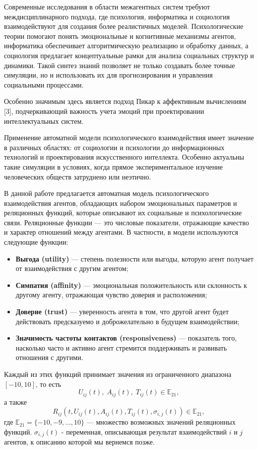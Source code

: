 \documentclass[12pt]{article}
\begin{document}
Современные исследования в области межагентных систем требуют междисциплинарного подхода, где психология, информатика и социология взаимодействуют для создания более реалистичных моделей. Психологические теории помогают понять эмоциональные и когнитивные механизмы агентов, информатика обеспечивает алгоритмическую реализацию и обработку данных, а социология предлагает концептуальные рамки для анализа социальных структур и динамики. Такой синтез знаний позволяет не только создавать более точные симуляции, но и использовать их для прогнозирования и управления социальными процессами.

Особенно значимым здесь является подход Пикар к аффективным вычислениям [3], подчеркивающий важность учета эмоций при проектировании интеллектуальных систем.

Применение автоматной модели психологического взаимодействия имеет значение в различных областях: от социологии и психологии до информационных технологий и проектирования искусственного интеллекта. Особенно актуальны такие симуляции в условиях, когда прямое экспериментальное изучение человеческих обществ затруднено или неэтично.

В данной работе предлагается автоматная модель психологического взаимодействия агентов, обладающих набором эмоциональных параметров и реляционных функций, которые описывают их социальные и психологические связи. Реляционные функции — это числовые показатели, отражающие качество и характер отношений между агентами. В частности, в модели используются следующие функции:

\begin{itemize}
    \item \textbf{Выгода (utility)} — степень полезности или выгоды, которую агент получает от взаимодействия с другим агентом;
    \item \textbf{Симпатия (affinity)} — эмоциональная положительность или склонность к другому агенту, отражающая чувство доверия и расположения;
    \item \textbf{Доверие (trust)} — уверенность агента в том, что другой агент будет действовать предсказуемо и доброжелательно в будущем взаимодействии;
    \item \textbf{Значимость частоты контактов (responsiveness)} — показатель того, насколько часто и активно агент стремится поддерживать и развивать отношения с другими.
\end{itemize}

Каждый из этих функций принимает значения из ограниченного диапазона \([-10, 10]\), то есть
\[
U_{ij}(t),\; A_{ij}(t),\; T_{ij}(t) \in \mathbb{E}_{21},
\]
а также
\[
R_{ij}(t, U_{ij}(t), A_{ij}(t), T_{ij}(t), \sigma_{i,j}(t))\in \mathbb{E}_{21},
\]
где \(\mathbb{E}_{21} = \{-10, -9, \dots, 10\}\) — множество возможных значений реляционных функций. \(\sigma_{i,j}(t)\) - переменная, описывающая результат взаимодействий \(i\) и \(j\) агентов, к описанию которой мы вернемся позже. 
\end{document}

